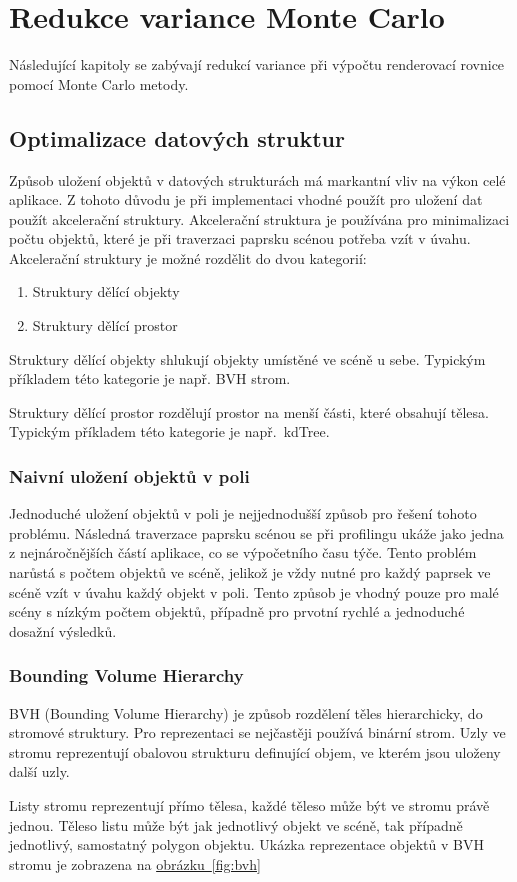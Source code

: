 \documentclass[czech,master]{diploma}
\begin{document}
\clearpage
\chapter{Redukce variance Monte Carlo}\label{sec:reduction}
Následující kapitoly se zabývají redukcí variance při výpočtu renderovací rovnice pomocí Monte Carlo metody.


\section{Optimalizace datových struktur}
Způsob uložení objektů v datových strukturách má markantní vliv na výkon celé aplikace. Z tohoto důvodu je při implementaci vhodné použít pro uložení dat použít akcelerační struktury. Akcelerační struktura je používána pro minimalizaci počtu objektů, které je při traverzaci paprsku scénou potřeba vzít v úvahu. Akcelerační struktury je možné rozdělit do dvou kategorií:
\begin{enumerate}
  \item Struktury dělící objekty
  \item Struktury dělící prostor
\end{enumerate}
\par
Struktury dělící objekty shlukují objekty umístěné ve scéně u sebe. Typickým příkladem této kategorie je např. BVH strom. \par
Struktury dělící prostor rozdělují prostor na menší části, které obsahují tělesa. Typickým příkladem této kategorie je např.\ kdTree.

\subsection{Naivní uložení objektů v poli}
Jednoduché uložení objektů v poli je nejjednodušší způsob pro řešení tohoto problému. Následná traverzace paprsku scénou se při profilingu ukáže jako jedna z nejnáročnějších částí aplikace, co se výpočetního času týče. Tento problém narůstá s počtem objektů ve scéně, jelikož je vždy nutné pro každý paprsek ve scéně vzít v úvahu každý objekt v poli. Tento způsob je vhodný pouze pro malé scény s nízkým počtem objektů, případně pro prvotní rychlé a jednoduché dosažní výsledků.

\subsection{Bounding Volume Hierarchy}
BVH (Bounding Volume Hierarchy) je způsob rozdělení těles hierarchicky, do stromové struktury. Pro reprezentaci se nejčastěji používá binární strom. Uzly ve stromu reprezentují obalovou strukturu definující objem, ve kterém jsou uloženy další uzly.  \par
Listy stromu reprezentují přímo tělesa, každé těleso může být ve stromu právě jednou. Těleso listu může být jak jednotlivý objekt ve scéně, tak případně jednotlivý, samostatný polygon objektu. Ukázka reprezentace objektů v BVH stromu je zobrazena na \hyperref[fig:bvh]{obrázku~\ref{fig:bvh}}
\end{document}
